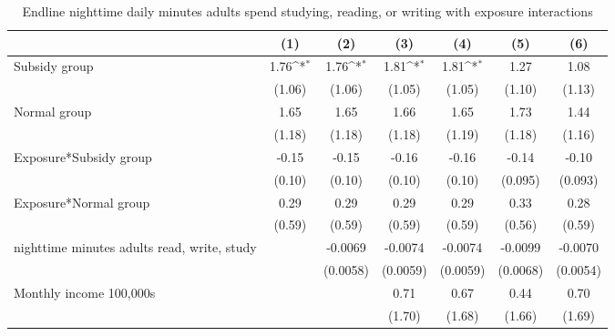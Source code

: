\begin{table}[htbp]\centering
\def\sym#1{\ifmmode^{#1}\else\(^{#1}\)\fi}
\caption{Endline nighttime daily minutes adults spend studying, reading, or writing with exposure interactions}
\begin{tabular*}{1\hsize}{@{\hskip\tabcolsep\extracolsep\fill}l*{6}{c}}
\toprule
                &\multicolumn{1}{c}{(1)}         &\multicolumn{1}{c}{(2)}         &\multicolumn{1}{c}{(3)}         &\multicolumn{1}{c}{(4)}         &\multicolumn{1}{c}{(5)}         &\multicolumn{1}{c}{(6)}         \\
\midrule
Subsidy group   &     1.76\sym{*}  &     1.76\sym{*}  &     1.81\sym{*}  &     1.81\sym{*}  &     1.27         &     1.08         \\
                &   (1.06)         &   (1.06)         &   (1.05)         &   (1.05)         &   (1.10)         &   (1.13)         \\
Normal group    &     1.65         &     1.65         &     1.66         &     1.65         &     1.73         &     1.44         \\
                &   (1.18)         &   (1.18)         &   (1.18)         &   (1.19)         &   (1.18)         &   (1.16)         \\
Exposure*Subsidy group&    -0.15         &    -0.15         &    -0.16         &    -0.16         &    -0.14         &    -0.10         \\
                &   (0.10)         &   (0.10)         &   (0.10)         &   (0.10)         &  (0.095)         &  (0.093)         \\
Exposure*Normal group&     0.29         &     0.29         &     0.29         &     0.29         &     0.33         &     0.28         \\
                &   (0.59)         &   (0.59)         &   (0.59)         &   (0.59)         &   (0.56)         &   (0.59)         \\
nighttime minutes adults read, write, study&                  &  -0.0069         &  -0.0074         &  -0.0074         &  -0.0099         &  -0.0070         \\
                &                  & (0.0058)         & (0.0059)         & (0.0059)         & (0.0068)         & (0.0054)         \\
Monthly income 100,000s&                  &                  &     0.71         &     0.67         &     0.44         &     0.70         \\
                &                  &                  &   (1.70)         &   (1.68)         &   (1.66)         &   (1.69)         \\

\end{tabular*}
\end{table}
